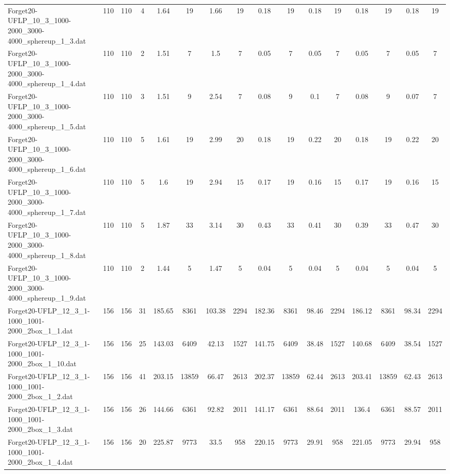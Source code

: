 \begin{sidewaystable}[!ht]
{\begin{tabular}{lccccccccccccccc}
Forget20-UFLP\_10\_3\_1000-2000\_3000-4000\_sphereup\_1\_3.dat & 110 & 110 & 4 & 1.64 & 19 & 1.66 & 19 &  \textcolor{blue2}{0.18} & 19 &  \textcolor{blue2}{0.18} & 19 &  \textcolor{blue2}{0.18} & 19 &  \textcolor{blue2}{0.18} & 19 \\
Forget20-UFLP\_10\_3\_1000-2000\_3000-4000\_sphereup\_1\_4.dat & 110 & 110 & 2 & 1.51 & 7 & 1.5 & 7 &  \textcolor{blue2}{0.05} & 7 &  \textcolor{blue2}{0.05} & 7 &  \textcolor{blue2}{0.05} & 7 &  \textcolor{blue2}{0.05} & 7 \\
Forget20-UFLP\_10\_3\_1000-2000\_3000-4000\_sphereup\_1\_5.dat & 110 & 110 & 3 & 1.51 & 9 & 2.54 & 7 & 0.08 & 9 & 0.1 & 7 & 0.08 & 9 &  \textcolor{blue2}{0.07} & 7 \\
Forget20-UFLP\_10\_3\_1000-2000\_3000-4000\_sphereup\_1\_6.dat & 110 & 110 & 5 & 1.61 & 19 & 2.99 & 20 &  \textcolor{blue2}{0.18} & 19 & 0.22 & 20 &  \textcolor{blue2}{0.18} & 19 & 0.22 & 20 \\
Forget20-UFLP\_10\_3\_1000-2000\_3000-4000\_sphereup\_1\_7.dat & 110 & 110 & 5 & 1.6 & 19 & 2.94 & 15 & 0.17 & 19 &  \textcolor{blue2}{0.16} & 15 & 0.17 & 19 &  \textcolor{blue2}{0.16} & 15 \\
Forget20-UFLP\_10\_3\_1000-2000\_3000-4000\_sphereup\_1\_8.dat & 110 & 110 & 5 & 1.87 & 33 & 3.14 & 30 & 0.43 & 33 & 0.41 & 30 &  \textcolor{blue2}{0.39} & 33 & 0.47 & 30 \\
Forget20-UFLP\_10\_3\_1000-2000\_3000-4000\_sphereup\_1\_9.dat & 110 & 110 & 2 & 1.44 & 5 & 1.47 & 5 &  \textcolor{blue2}{0.04} & 5 &  \textcolor{blue2}{0.04} & 5 &  \textcolor{blue2}{0.04} & 5 &  \textcolor{blue2}{0.04} & 5 \\
Forget20-UFLP\_12\_3\_1-1000\_1001-2000\_2box\_1\_1.dat & 156 & 156 & 31 & 185.65 & 8361 & 103.38 & 2294 & 182.36 & 8361 & 98.46 & 2294 & 186.12 & 8361 &  \textcolor{blue2}{98.34} & 2294 \\
Forget20-UFLP\_12\_3\_1-1000\_1001-2000\_2box\_1\_10.dat & 156 & 156 & 25 & 143.03 & 6409 & 42.13 & 1527 & 141.75 & 6409 &  \textcolor{blue2}{38.48} & 1527 & 140.68 & 6409 & 38.54 & 1527 \\
Forget20-UFLP\_12\_3\_1-1000\_1001-2000\_2box\_1\_2.dat & 156 & 156 & 41 & 203.15 & 13859 & 66.47 & 2613 & 202.37 & 13859 & 62.44 & 2613 & 203.41 & 13859 &  \textcolor{blue2}{62.43} & 2613 \\
Forget20-UFLP\_12\_3\_1-1000\_1001-2000\_2box\_1\_3.dat & 156 & 156 & 26 & 144.66 & 6361 & 92.82 & 2011 & 141.17 & 6361 & 88.64 & 2011 & 136.4 & 6361 & 88.57 & 2011 \\
Forget20-UFLP\_12\_3\_1-1000\_1001-2000\_2box\_1\_4.dat & 156 & 156 & 20 & 225.87 & 9773 & 33.5 & 958 & 220.15 & 9773 &  \textcolor{blue2}{29.91} & 958 & 221.05 & 9773 & 29.94 & 958 \\

\end{tabular}}
\end{sidewaystable}
